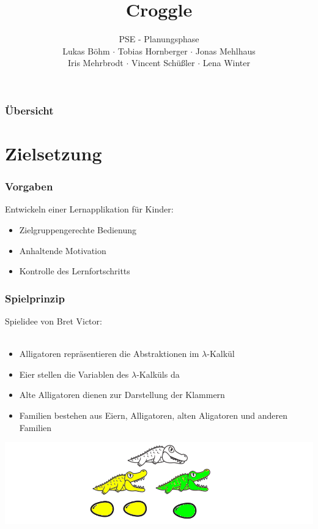\documentclass[t]{beamer}
\title{Croggle}
\subtitle{PSE - Planungsphase \\[0.3cm]
Lukas Böhm $\cdot$ Tobias Hornberger $\cdot$ Jonas Mehlhaus \\ Iris Mehrbrodt  $\cdot$ Vincent Schüßler $\cdot$ Lena Winter}
\institute[IPD]{Institut für Programmstruktutren und Datenorganisation}
\begin{document}
\begin{frame}
        \maketitle
\end{frame}

\begin{frame}
        \frametitle{Übersicht}
        \tableofcontents
\end{frame}

\section{Zielsetzung}
\begin{frame}
	\frametitle{Vorgaben}
	Entwickeln einer Lernapplikation für Kinder:\\
	\begin{itemize}
		\item Zielgruppengerechte Bedienung
		\item Anhaltende Motivation
		\item Kontrolle des Lernfortschritts
	\end{itemize}
\end{frame}

\begin{frame}
	\frametitle{Spielprinzip}
	Spielidee von Bret Victor: \\
     \\
	\begin{itemize}
		\item Alligatoren repräsentieren die Abstraktionen im \(\lambda\)-Kalkül
		\item Eier stellen die Variablen des \(\lambda\)-Kalküls da
		\item Alte Alligatoren dienen zur Darstellung der Klammern
		\item Familien bestehen aus Eiern, Alligatoren, alten Aligatoren und anderen Familien 
	\end{itemize}
	\includegraphics[width=\textwidth]{Spielelemente.png}
\end{frame}
\end{document}
